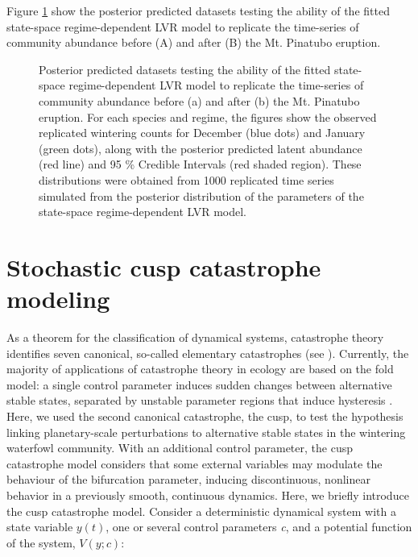 \documentclass[11pt]{article}
\begin{document}
{Figure \ref{fig:PPC} show the posterior predicted datasets testing the ability of the fitted state-space regime-dependent LVR model to replicate the time-series of community abundance before (A) and after (B) the Mt. Pinatubo eruption.

\newpage

\renewcommand{\thefigure}{S3}
\begin{figure}[h!]
	\centering
	\qquad
	\caption{Posterior predicted datasets testing the ability of the fitted state-space regime-dependent LVR model to replicate the time-series of community abundance before (a) and after (b) the Mt. Pinatubo eruption. For each species and regime, the figures show the observed replicated wintering counts for December (blue dots) and January (green dots), along with the posterior predicted latent abundance (red line) and 95 \% Credible Intervals (red shaded region). These distributions were obtained from 1000 replicated time series simulated from the posterior distribution of the parameters of the state-space regime-dependent LVR model.}%
	\label{fig:PPC}%
\end{figure}

\section{Stochastic cusp catastrophe modeling}

As a theorem for the classification of dynamical systems, catastrophe theory identifies seven canonical, so-called elementary catastrophes (see \cite{Thom1975,Arnold1994}). Currently, the majority of applications of catastrophe theory in ecology are based on the fold model: a single control parameter induces sudden changes between alternative stable states, separated by unstable parameter regions that induce hysteresis \cite{Dakos2019,Scheffer2009a}. Here, we used the second canonical catastrophe, the cusp, to test the hypothesis linking planetary-scale perturbations to alternative stable states in the wintering waterfowl community. With an additional control parameter, the cusp catastrophe model considers that some external variables may modulate the behaviour of the bifurcation parameter, inducing discontinuous, nonlinear behavior in a previously smooth, continuous dynamics. Here, we briefly introduce the cusp catastrophe model. Consider a deterministic dynamical system with a state variable $ y(t) $, one or several control parameters \textit{c}, and a potential function of the system, $ V(y; c) $:

}
\end{document}

